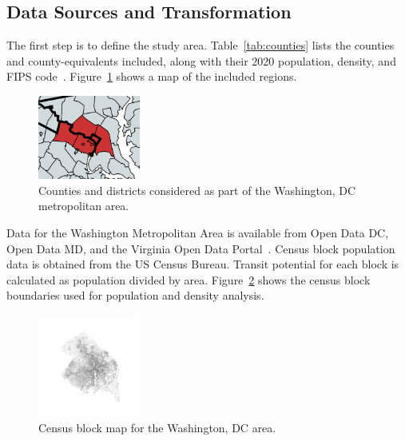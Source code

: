 \documentclass[sigconf,nonacm]{acmart}
\begin{document}
\subsection{Data Sources and Transformation}
The first step is to define the study area. Table~\ref{tab:counties} lists the counties and county-equivalents included, along with their 2020 population, density, and FIPS code~\cite{lit:census}. Figure~\ref{fig:area_considered} shows a map of the included regions.
\begin{figure}[ht]
    \centering
    \includegraphics[width=0.3\textwidth]{./img/area_considered.png}
    \caption{Counties and districts considered as part of the Washington, DC metropolitan area.}
    \label{fig:area_considered}
\end{figure}

Data for the Washington Metropolitan Area is available from Open Data DC, Open Data MD, and the Virginia Open Data Portal~\cite{lit:opendata}. Census block population data is obtained from the US Census Bureau. Transit potential for each block is calculated as population divided by area. Figure~\ref{fig:city_map} shows the census block boundaries used for population and density analysis.

\begin{figure}[ht]
    \centering
    \includegraphics[width=0.3\textwidth]{./img/city_map.png}
    \caption{Census block map for the Washington, DC area.}
    \label{fig:city_map}
\end{figure}
\end{document}
